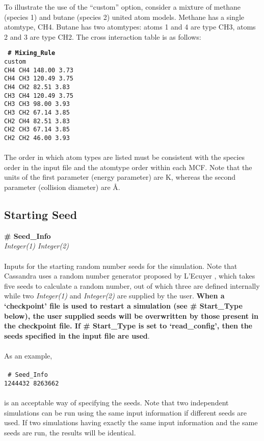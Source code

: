 To illustrate the use of the ``custom'' option, consider a mixture of methane (species 1) and butane (species 2) united atom
models. Methane has a single atomtype, CH4. Butane has two atomtypes: atoms 1 and 4 are type CH3, atoms 2 and 3 are type CH2.
The cross interaction table is as follows:

\texttt{
{\bf \# Mixing\_Rule} \\
custom\\
CH4  CH4  148.00   3.73\\
CH4  CH3  120.49   3.75\\
CH4  CH2   82.51   3.83\\
CH3  CH4  120.49   3.75\\
CH3  CH3   98.00   3.93\\
CH3  CH2   67.14   3.85\\
CH2  CH4   82.51   3.83\\
CH2  CH3   67.14   3.85\\
CH2  CH2   46.00   3.93
}
\\ \\
The order in which atom types are listed must be consistent with the species order in the input file and the atomtype order within each MCF.
Note that the units of the first parameter (energy parameter) are K, whereas the second parameter (collision diameter) are \AA.

%
%
\subsection{Starting Seed}\label{sec:Seed_Info}
{\bf \# Seed\_Info} \\ 
{\it Integer(1) Integer(2)} \\ \\
%
Inputs for the starting random number seeds for the simulation. Note
that Cassandra uses a random  number generator proposed by L'Ecuyer
\cite{random_gen:1999}, which takes five  
seeds to calculate a random number, out of which three are 
defined internally while two {\it Integer(1)} and {\it Integer(2)} are
supplied by the user. {\bf When a `checkpoint' file is used to restart a
simulation (see \# Start\_Type below), the user supplied seeds will be
overwritten by those present in the checkpoint file. If \# Start\_Type
is set to `read\_config', then the seeds specified in the input file are
used}.  \\ \\
As an example, \\ \\ 
\texttt{
\# Seed\_Info \\
1244432 8263662
} \\ \\
is an acceptable way of specifying the seeds. Note that two independent
simulations can be run using the same input information if different
seeds are used. If two simulations having exactly the same input
information and the same seeds are run, the results will be
identical. 
%
%
%
